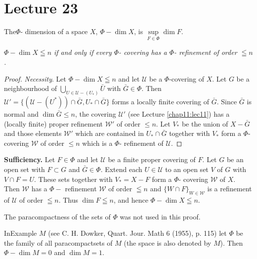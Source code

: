 \chapter{Lecture 23}\label{chap23:lec23}%

\begin{defi*}%
The\pageoriginale $\Phi$- dimension of a space $X$, $\Phi- \dim X$, is
$\sup\limits_{F \in \Phi} \dim F$.   
\end{defi*}

$\Phi - \dim X \leqq n$ \textit{if and only if every $\Phi$- covering
  has a $\Phi$- refinement of order $\leqq n$.} 

\begin{proof}
{\em Necessity}. Let $\Phi - \dim X \leqq n$ and let $\mathscr{U}$ be
a $\Phi$-covering of $X$. Let $G$ be a neighbourhood of $\bigcup
\limits_{U \in \mathscr{U} -(U_*) } \bar{U}$ with $\bar{G} \in
\Phi$. Then $\mathscr{U}'= \big\{ (\mathscr{U} -(U^*)) \cap  \bar{G}, U_*
\cap \bar{G} \big\}$ forms a locally finite covering of $\bar{G}$. Since
$\bar{G}$ is normal and $\dim \bar{G} \leq n$, the covering
$\mathscr{U}'$ (see Lecture \ref{chap11:lec11}) has a (locally finite) proper
refinement $\mathscr{W}'$ of order $\leq n$. Let $V_*$ be the union of
$X- \bar{G}$ and those elements $\mathscr{W}'$ which are contained in
$U_* \cap \bar{G}$ together with $V_*$ form a $\Phi$- covering
$\mathscr{W}$ of order $\leq n$ which is a $\Phi$- refinement of
$\mathscr{U}$. 
\end{proof}

\medskip
\noindent\textbf{Sufficiency.} Let $F \in \Phi$ and let $\mathscr{U}$ be a
finite proper covering of $F$. Let $G$ be an open set with $F \subset
G$ and $\bar{G} \in \Phi$. Extend each $U \in \mathscr{U}$ to an open
set $V$ of $G$ with $V \cap F  = U$. These sets together with $V_* = X
- F $ form a $\Phi$- covering $\mathscr{W}$ of $X$. Then $\mathscr{W}$
has a $\Phi-$ refinement $\mathscr{W}$ of order $\leqq n $  and $\{ W
\cap F\}_{ W \in \mathscr{W}}$ is a refinement of $\mathscr{U}$ of order
$\leqq n $. Thus $\dim F \leqq n$, and hence $\Phi - \dim X \leqq n$.  

\begin{note*}
 The paracompactness of the sets of $\Phi$ was not
used in this proof.  
\end{note*}

\begin{example*}%
In\pageoriginale Example $M$ (see C. H. Dowker, Quart. Jour. Math 6 (1955),
p. 115) let $\Phi$ be the family of all paracompactsets of $M$ (the
space is also denoted by $M$). Then $\Phi - \dim M = 0 $ and $\dim M =
1 $.  
\end{example*}

